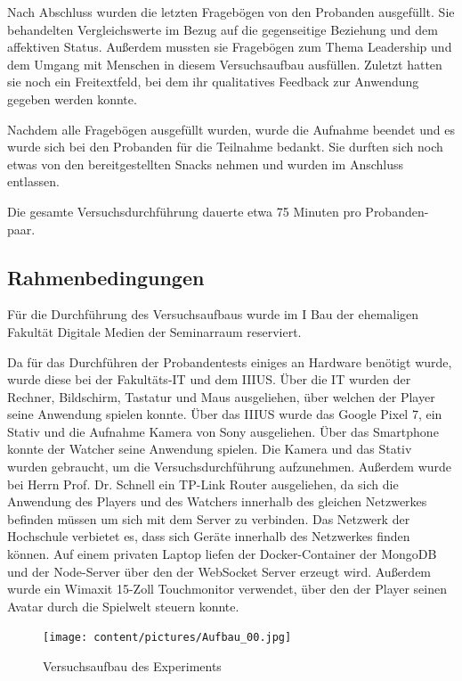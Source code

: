 Nach Abschluss wurden die letzten Fragebögen von den Probanden ausgefüllt. Sie behandelten Vergleichswerte im Bezug auf die gegenseitige Beziehung und dem affektiven Status. Außerdem mussten sie Fragebögen zum Thema Leadership und dem Umgang mit Menschen in diesem Versuchsaufbau ausfüllen. Zuletzt hatten sie noch ein Freitextfeld, bei dem ihr qualitatives Feedback zur Anwendung gegeben werden konnte.

Nachdem alle Fragebögen ausgefüllt wurden, wurde die Aufnahme beendet und es wurde sich bei den Probanden für die Teilnahme bedankt. Sie durften sich noch etwas von den bereitgestellten Snacks nehmen und wurden im Anschluss entlassen.

Die gesamte Versuchsdurchführung dauerte etwa 75 Minuten pro Probanden-paar.

\subsection{Rahmenbedingungen}
Für die Durchführung des Versuchsaufbaus wurde im I Bau der ehemaligen Fakultät Digitale Medien der Seminarraum reserviert. 

Da für das Durchführen der Probandentests einiges an Hardware benötigt wurde, wurde diese bei der Fakultäts-\ac{IT} und dem \ac{IIIUS}. Über die \ac{IT} wurden der Rechner, Bildschirm, Tastatur und Maus ausgeliehen, über welchen der Player seine Anwendung spielen konnte. Über das \ac{IIIUS} wurde das Google Pixel 7, ein Stativ und die Aufnahme Kamera von Sony ausgeliehen. Über das Smartphone konnte der Watcher seine Anwendung spielen. Die Kamera und das Stativ wurden gebraucht, um die Versuchsdurchführung aufzunehmen. Außerdem wurde bei Herrn Prof. Dr. Schnell ein TP-Link Router ausgeliehen, da sich die Anwendung des Players und des Watchers innerhalb des gleichen Netzwerkes befinden müssen um sich mit dem Server zu verbinden. Das Netzwerk der Hochschule verbietet es, dass sich Geräte innerhalb des Netzwerkes finden können.
Auf einem privaten Laptop liefen der Docker-Container der MongoDB und der Node-Server über den der WebSocket Server erzeugt wird. Außerdem wurde ein Wimaxit 15-Zoll Touchmonitor verwendet, über den der Player seinen Avatar durch die Spielwelt steuern konnte.

\begin{figure}[ht]
\centering
\texttt{[image: content/pictures/Aufbau\_00.jpg]}
\caption{Versuchsaufbau des Experiments}
\label{fig:study-experiment-00}
\end{figure}

